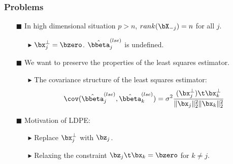 \begin{frame}
\frametitle{Problems}
\begin{itemize}

\item[$\blacksquare$] In high dimensional situation $p>n$, $rank(\bX_{-j})=n$ for all $j$. %
\begin{itemize}
\item[$\blacktriangleright$] $\bx^{\bot}_{j}=\bzero$. $\hat{\bbeta}^{(lse)}_{j}$ is undefined.
\end{itemize}
\item[$\blacksquare$] We want to preserve the properties of the least squares estimator.
\begin{itemize}
\item[$\blacktriangleright$] The covariance structure of the least squares estimator:
\begin{equation}
\cov(\hat{\bbeta}^{(lse)}_{j},\hat{\bbeta}^{(lse)}_{k})=\sigma^{2} \frac{(\bx^{\bot}_{j})\t \bx^{\bot}_{k}}{\|\bx_{j}\|^{2}_{2}\|\bx_{k}\|^{2}_{2}}
\end{equation}
\end{itemize}
\item[$\blacksquare$] Motivation of LDPE:
\begin{itemize}
      \item[$\blacktriangleright$] Replace $\bx^{\bot}_{j}$ with $\bz_{j}$.
      \medskip
      \item[$\blacktriangleright$] Relaxing the constraint $\bz_{j}\t \bx_{k}=\bzero$ for $k\neq j$.
\vspace{3mm}

\end{itemize}

\end{itemize}


\end{frame}

